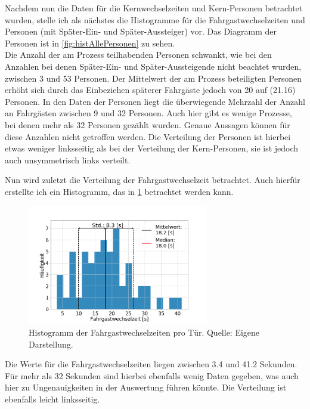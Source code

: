 Nachdem nun die Daten für die Kernwechselzeiten und Kern-Personen betrachtet wurden, stelle ich als nächstes die Histogramme für die Fahrgastwechselzeiten und Personen (mit Später-Ein- und Später-Aussteiger) vor. Das Diagramm der Personen ist in \figurename \ref{fig:histAllePersonen} zu sehen. \\
Die Anzahl der am Prozess teilhabenden Personen schwankt, wie bei den Anzahlen bei denen Später-Ein- und Später-Aussteigende nicht beachtet wurden, zwischen 3 und 53 Personen. Der Mittelwert der am Prozess beteiligten Personen erhöht sich durch das Einbeziehen späterer Fahrgäste jedoch von 20 auf  (21.16) Personen. In den Daten der Personen liegt die überwiegende Mehrzahl der Anzahl an Fahrgästen zwischen 9 und 32 Personen. Auch hier gibt es wenige Prozesse, bei denen mehr als 32 Personen gezählt wurden. Genaue Aussagen können für diese Anzahlen nicht getroffen werden. Die Verteilung der Personen ist hierbei etwas weniger linksseitig als bei der Verteilung der Kern-Personen, sie ist jedoch auch unsymmetrisch links verteilt.

Nun wird zuletzt die Verteilung der Fahrgastwechselzeit betrachtet. Auch hierfür erstellte ich ein Histogramm, das in \figurename \ref{fig:histAllTimes} betrachtet werden kann.
\begin{figure}[H]
	\centering
	\includegraphics[width=0.7\textwidth]{pictures/data_evaluation/transferTime/hist_transfer_times.png}
	\caption{Histogramm der Fahrgastwechselzeiten pro Tür. Quelle: Eigene Darstellung.}
	\label{fig:histAllTimes}
\end{figure}
Die Werte für die Fahrgastwechselzeiten liegen zwischen 3.4 und 41.2 Sekunden. Für mehr als 32 Sekunden sind hierbei ebenfalls wenig Daten gegeben, was auch hier zu Ungenauigkeiten in der Auswertung führen könnte. Die Verteilung ist ebenfalls leicht linksseitig.

